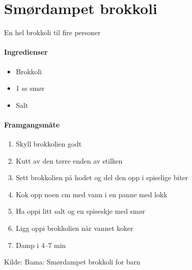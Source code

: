 \section{﻿Smørdampet brokkoli}
\label{brokkoli}
En hel brokkoli til fire personer

\paragraph{Ingredienser}
\begin{itemize}[noitemsep]
	\item Brokkoli
	\item 1 ss smør
	\item Salt
\end{itemize}

\paragraph{Framgangsmåte}
\begin{enumerate}[noitemsep]
	\item Skyll brokkolien godt
	\item Kutt av den tørre enden av stilken
	\item Sett brokkolien på hodet og del den opp i spiselige biter
	\item Kok opp noen cm med vann i en panne med lokk
	\item Ha oppi litt salt og en spiseskje med smør
	\item Ligg oppi brokkolien når vannet koker
	\item Damp i 4--7 min
\end{enumerate}

Kilde: Bama: Smørdampet brokkoli for barn

